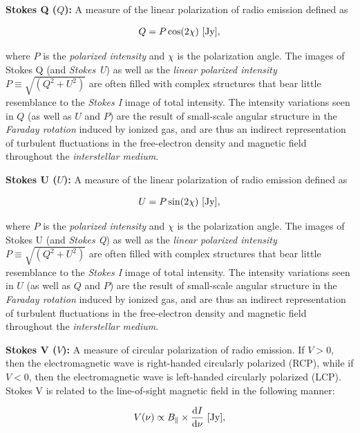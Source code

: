 \documentclass[a4paper,10pt]{article}
\begin{document}
{\noindent}\textbf{Stokes Q ($Q$):} A measure of the linear polarization of radio emission defined as

\begin{align*}
    Q = P\cos(2\chi) ~ [{\rm Jy}],
\end{align*}

{\noindent}where $P$ is the \textit{polarized intensity} and $\chi$ is the polarization angle. The images of Stokes Q (and \textit{Stokes U}) as well as the \textit{linear polarized intensity} $P\equiv\sqrt{(Q^2+U^2)}$ are often filled with complex structures that bear little resemblance to the \textit{Stokes I} image of total intensity. The intensity variations seen in $Q$ (as well as $U$ and $P$) are the result of small-scale angular structure in the \textit{Faraday rotation} induced by ionized gas, and are thus an indirect representation of turbulent fluctuations in the free-electron density and magnetic field throughout the \textit{interstellar medium}.

{\noindent}\textbf{Stokes U ($U$):} A measure of the linear polarization of radio emission defined as

\begin{align*}
    U = P\sin(2\chi) ~ [{\rm Jy}],
\end{align*}

{\noindent}where $P$ is the \textit{polarized intensity} and $\chi$ is the polarization angle. The images of Stokes U (and \textit{Stokes Q}) as well as the \textit{linear polarized intensity} $P\equiv\sqrt{(Q^2+U^2)}$ are often filled with complex structures that bear little resemblance to the \textit{Stokes I} image of total intensity. The intensity variations seen in $U$ (as well as $Q$ and $P$) are the result of small-scale angular structure in the \textit{Faraday rotation} induced by ionized gas, and are thus an indirect representation of turbulent fluctuations in the free-electron density and magnetic field throughout the \textit{interstellar medium}.

{\noindent}\textbf{Stokes V ($V$):} A measure of circular polarization of radio emission. If $V>0$, then the electromagnetic wave is right-handed circularly polarized (RCP), while if $V<0$, then the electromagnetic wave is left-handed circularly polarized (LCP). Stokes V is related to the line-of-sight magnetic field in the following manner:

\begin{align*}
    V(\nu) \propto B_\parallel \times \frac{\mathrm{d}I}{\mathrm{d}\nu} ~ [{\rm Jy}],
\end{align*}
\end{document}
